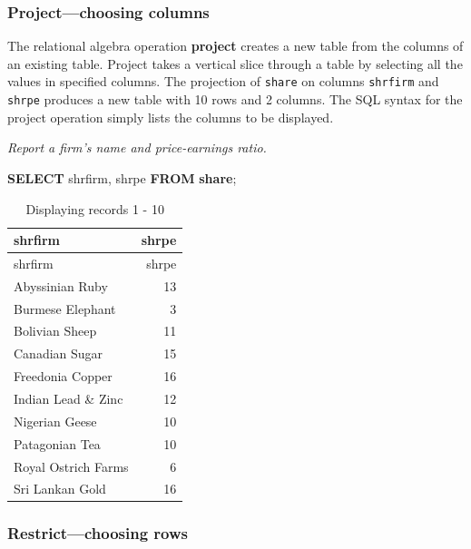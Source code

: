 \documentclass[
]{article}
\newenvironment{Shaded}{\begin{snugshade}}{\end{snugshade}}
\newcommand{\KeywordTok}[1]{\textcolor[rgb]{0.13,0.29,0.53}{\textbf{#1}}}
\newcommand{\NormalTok}[1]{#1}
\begin{document}
\hypertarget{projectchoosing-columns}{%
\subsubsection{Project---choosing
columns}\label{projectchoosing-columns}}

The relational algebra operation \textbf{project} creates a new table
from the columns of an existing table. Project takes a vertical slice
through a table by selecting all the values in specified columns. The
projection of \texttt{share} on columns \texttt{shrfirm} and
\texttt{shrpe} produces a new table with 10 rows and 2 columns. The SQL
syntax for the project operation simply lists the columns to be
displayed.

\emph{Report a firm's name and price-earnings ratio.}

\begin{Shaded}
\begin{Highlighting}[]
\KeywordTok{SELECT}\NormalTok{ shrfirm, shrpe }\KeywordTok{FROM} \KeywordTok{share}\NormalTok{;}
\end{Highlighting}
\end{Shaded}

\begin{longtable}[]{@{}lr@{}}
\caption{Displaying records 1 - 10}\tabularnewline
\toprule()
shrfirm & shrpe \\
\midrule()
\endfirsthead
\toprule()
shrfirm & shrpe \\
\midrule()
\endhead
Abyssinian Ruby & 13 \\
Burmese Elephant & 3 \\
Bolivian Sheep & 11 \\
Canadian Sugar & 15 \\
Freedonia Copper & 16 \\
Indian Lead \& Zinc & 12 \\
Nigerian Geese & 10 \\
Patagonian Tea & 10 \\
Royal Ostrich Farms & 6 \\
Sri Lankan Gold & 16 \\
\bottomrule()
\end{longtable}

\hypertarget{restrictchoosing-rows}{%
\subsubsection{Restrict---choosing rows}\label{restrictchoosing-rows}}
\end{document}
